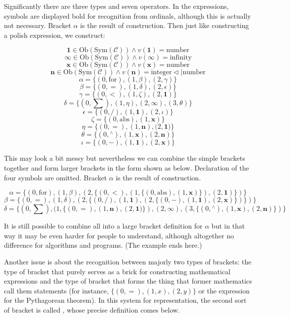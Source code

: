 \documentclass{article}
\begin{document}
Significantly there are three types and seven operators. In the expressions, symbols are displayed bold for recognition from ordinals, although this
is actually not necessary. Bracket \(\alpha\) is the result of construction. Then just like constructing a polish expression, we construct:

\[\pmb{1}\in \text{Ob}(\text{Sym}(\mathcal{C}))\land \mathit{v}(\pmb{1})=\text{number}\]
\[\pmb{\infty }\in \text{Ob}(\text{Sym}(\mathcal{C}))\land \mathit{v}(\pmb{\infty })=\text{infinity}\]
\[\pmb{x}\in \text{Ob}(\text{Sym}(\mathcal{C}))\land \mathit{v}(\pmb{x})=\text{number}\]
\[\pmb{n}\in \text{Ob}(\text{Sym}(\mathcal{C}))\land \mathit{v}(\pmb{n})=\text{integer}\triangleleft |\text{number}\]
\[\alpha =\{(0,\text{for}),(1,\beta ),(2,\gamma )\}\]
\[\beta =\{(0,=),(1,\delta ),(2,\epsilon )\}\]
\[\gamma =\{(0,<),(1,\zeta ),(2,\pmb{1})\}\]
\[\delta =\{(0,\sum ),(1,\eta ),(2,\pmb{\infty }), (3,\theta )\}\]
\[\epsilon =\{(0,/),(1,\pmb{1}),(2,\iota )\}\]
\[\zeta =\{(0,\text{abs}),(1,\pmb{x})\}\]
\[\eta =\{(0,=),(1,\pmb{n}),(2,\pmb{1}\pmb{)}\pmb{\}}\]
\[\theta =\{(0,{}^{\wedge}),(1,\pmb{x}),(2,\pmb{n})\}\]
\[\iota =\{(0,-),(1,\pmb{1}),(2,\pmb{x})\}\]

This may look a bit messy but nevertheless we can combine the simple brackets together and form larger brackets in the form shown as below. Declaration of the four symbols are omitted. Bracket \(\alpha\) is the result of construction.

\[\alpha =\{(0,\text{for}),(1,\beta ),(2,\{(0,<),(1,\{(0,\text{abs}),(1,\pmb{x})\}),(2,\pmb{1})\})\}\]
\[\beta =\{(0,=),(1,\delta ),(2,\{(0,/),(1,\pmb{1}),(2,\{(0,-),(1,\pmb{1}),(2,\pmb{x})\})\})\}\]
\[\delta =\{(0,\sum ),(1,\{(0,=),(1,\pmb{n}),(2,\pmb{1}\pmb{)}\pmb{\}}),(2,\pmb{\infty }), (3,\{(0,{}^{\wedge}),(1,\pmb{x}),(2,\pmb{n})\})\}\]

It is still possible to combine all into a large bracket definition for \(\alpha\) but in that way it may be even harder for people to understand, although altogether no difference for algorithms and programs. (The example ends here.)

Another issue is about the recognition between majorly two types of brackets: the type of bracket that purely serves as a brick for constructing mathematical expressions and the type of bracket that forms the thing that former mathematics call them statements (for instance, \(\{(0,=),(1,x),(2,y)\}\) or the expression for the Pythagorean theorem). In this system for representation, the second sort of bracket is called , whose precise definition comes below.
\end{document}
